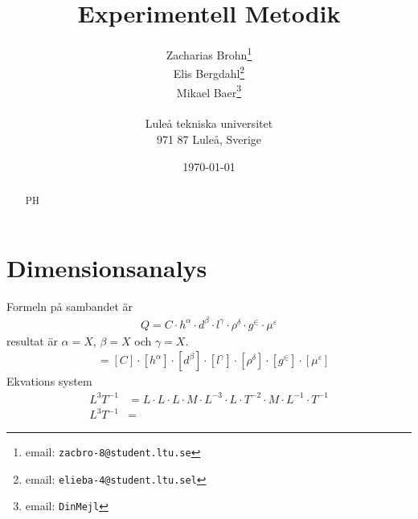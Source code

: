 \documentclass[a4paper,12pt]{article}
\title{Experimentell Metodik}
\author{Zacharias Brohn\thanks{email: \texttt{zacbro-8@student.ltu.se}}\\  
        Elis Bergdahl\thanks{email: \texttt{elieba-4@student.ltu.sel}} \\
        Mikael Baer\thanks{email: \texttt{DinMejl}} \\
        ~ \\
        Luleå tekniska universitet \\ 
        971 87 Luleå, Sverige}
\date{\today}
\begin{document}
%
\begin{abstract}
    PH
\end{abstract}
%
\section{Dimensionsanalys}
Formeln på sambandet är
\begin{align}
    Q = C \cdot h^\alpha \cdot d^\beta \cdot l^\gamma \cdot \rho^\delta \cdot g^\in \cdot \mu^\varepsilon
\end{align}
resultat är $\alpha = X$, $\beta = X$ och $\gamma = X$.
\begin{align}
    [Q] &= [C] \cdot [h^\alpha] \cdot [d^\beta] \cdot [l^\gamma] \cdot [\rho^\delta] \cdot [g^\in] \cdot [\mu^\varepsilon]
\end{align}
Ekvations system
\begin{align}
    L^3T^{-1} &= L \cdot L \cdot L \cdot M \cdot L^{-3} \cdot L \cdot T^{-2} \cdot M \cdot L^{-1} \cdot T^{-1} \\
    L^3T^{-1} &= 
\end{align}
\end{document}
